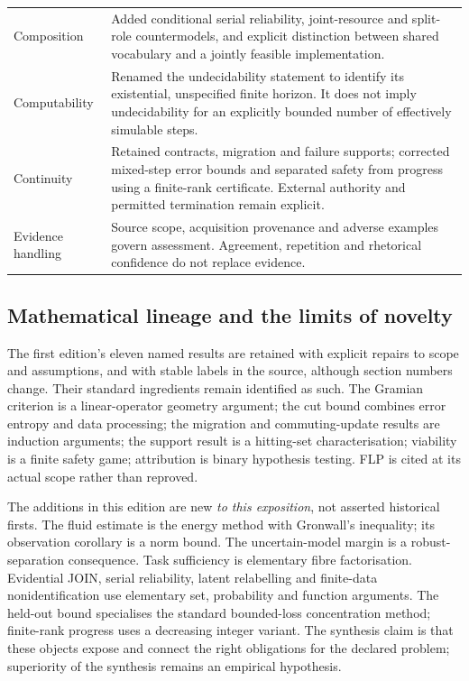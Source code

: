 \begin{longtable}{@{}>{\raggedright\arraybackslash}p{}>{\raggedright\arraybackslash}p{}@{}}
Composition & Added conditional serial reliability, joint-resource and split-role countermodels, and explicit distinction between shared vocabulary and a jointly feasible implementation. \\\addlinespace
Computability & Renamed the undecidability statement to identify its existential, unspecified finite horizon. It does not imply undecidability for an explicitly bounded number of effectively simulable steps. \\\addlinespace
Continuity & Retained contracts, migration and failure supports; corrected mixed-step error bounds and separated safety from progress using a finite-rank certificate. External authority and permitted termination remain explicit. \\\addlinespace
Evidence handling & Source scope, acquisition provenance and adverse examples govern assessment. Agreement, repetition and rhetorical confidence do not replace evidence. \\
\bottomrule
\end{longtable}

\subsection{Mathematical lineage and the limits of novelty}
The first edition's eleven named results are retained with explicit repairs to scope and assumptions, and with stable labels in the source, although section numbers change. Their standard ingredients remain identified as such. The Gramian criterion is a linear-operator geometry argument; the cut bound combines error entropy and data processing; the migration and commuting-update results are induction arguments; the support result is a hitting-set characterisation; viability is a finite safety game; attribution is binary hypothesis testing. FLP is cited at its actual scope rather than reproved.

The additions in this edition are new \emph{to this exposition}, not asserted historical firsts. The fluid estimate is the energy method with Gronwall's inequality; its observation corollary is a norm bound. The uncertain-model margin is a robust-separation consequence. Task sufficiency is elementary fibre factorisation. Evidential JOIN, serial reliability, latent relabelling and finite-data nonidentification use elementary set, probability and function arguments. The held-out bound specialises the standard bounded-loss concentration method; finite-rank progress uses a decreasing integer variant. The synthesis claim is that these objects expose and connect the right obligations for the declared problem; superiority of the synthesis remains an empirical hypothesis.

